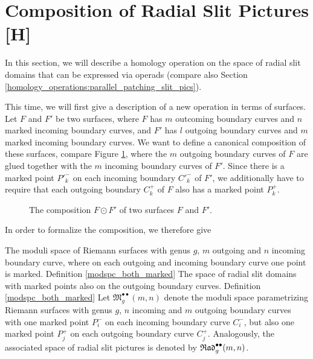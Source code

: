 \section{Composition of Radial Slit Pictures [H]}
\label{radial_composition}

In this section, we will describe a homology operation on the space of radial slit domains 
that can be expressed via operads (compare also Section \ref{homology_operations:parallel_patching_slit_pics}).

This time, we will first give a description of a new operation in terms of surfaces.
Let $F$ and $F'$ be two surfaces, where $F$ has $m$ outcoming boundary curves and $n$ marked incoming boundary curves,
and $F'$ has $l$ outgoing boundary curves and $m$ marked incoming boundary curves.
We want to define a canonical composition of these surfaces, compare Figure \ref{radial_connected_sum_on_surfaces},
where the $m$ outgoing boundary curves of $F$ are glued together with the $m$ incoming boundary curves of $F'$.
Since there is a marked point ${P'}^-_k$ on each incoming boundary ${C'}^-_k$ of $F'$, we additionally have to require that each outgoing boundary ${C}^+_k$ of $F$ also has a marked point ${P}^+_k$.

\begin{figure}[ht]
    \centering
    \def\svgwidth{.8\columnwidth}
    
    \caption{\label{radial_connected_sum_on_surfaces}The composition $F \odot F'$ of two surfaces $F$ and $F'$.}
\end{figure}

In order to formalize the composition, we therefore give

\begin{defi}
\label{modspc_both_marked}
  {The moduli space of Riemann surfaces with genus $g$, $m$ outgoing and $n$ incoming boundary curve, where on each outgoing and incoming boundary curve one point is marked.}
  {Definition \ref{modspc_both_marked}}
  {The space of radial slit domains with marked points also on the outgoing boundary curves.}
  {Definition \ref{modspc_both_marked}}
   Let $\mathfrak{M}^{\bullet \bullet}_{g}(m, n)$ denote the moduli space parametrizing Riemann surfaces with genus $g$, $n$ incoming and $m$ outgoing boundary curves
   with one marked point $P^-_i$ on each incoming boundary curve $C^-_i$, but also one marked point $P^+_j$ on each outgoing boundary curve $C^+_j$. 
   Analogously, the associated space of radial slit pictures is denoted by $\mathfrak{Rad}^{\bullet \bullet}_g(m, n)$.
\end{defi}

